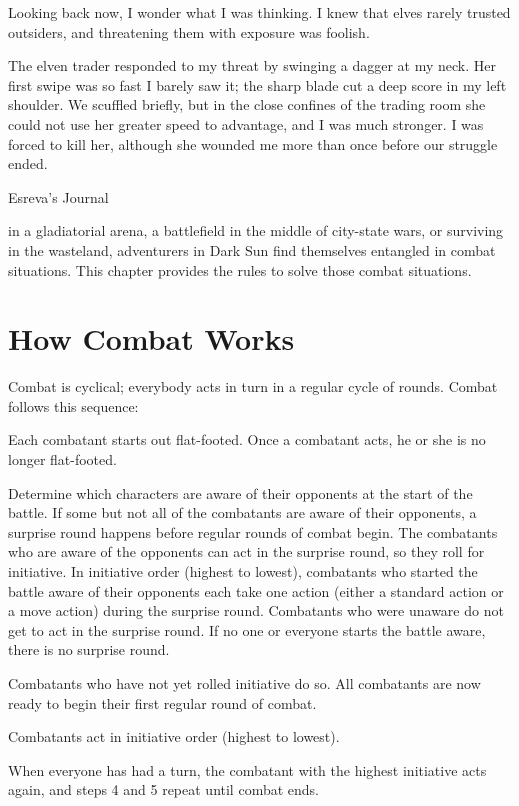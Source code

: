 {Looking back now, I wonder what I was thinking. I knew that elves rarely trusted outsiders, and threatening them with exposure was foolish.

The elven trader responded to my threat by swinging a dagger at my neck. Her first swipe was so fast I barely saw it; the sharp blade cut a deep score in my left shoulder. We scuffled briefly, but in the close confines of the trading room she could not use her greater speed to advantage, and I was much stronger. I was forced to kill her, although she wounded me more than once before our struggle ended.}{Esreva's Journal}

 in a gladiatorial arena, a battlefield in the middle of city-state wars, or surviving in the wasteland, adventurers in {\tableheader Dark Sun} find themselves entangled in combat situations. This chapter provides the rules to solve those combat situations.

\section{How Combat Works}
Combat is cyclical; everybody acts in turn in a regular cycle of rounds. Combat follows this sequence:

\begin{enumerate*}
\item Each combatant starts out flat-footed. Once a combatant acts, he or she is no longer flat-footed.

\item Determine which characters are aware of their opponents at the start of the battle. If some but not all of the combatants are aware of their opponents, a surprise round happens before regular rounds of combat begin. The combatants who are aware of the opponents can act in the surprise round, so they roll for initiative. In initiative order (highest to lowest), combatants who started the battle aware of their opponents each take one action (either a standard action or a move action) during the surprise round. Combatants who were unaware do not get to act in the surprise round. If no one or everyone starts the battle aware, there is no surprise round.

\item Combatants who have not yet rolled initiative do so. All combatants are now ready to begin their first regular round of combat.

\item Combatants act in initiative order (highest to lowest).

\item When everyone has had a turn, the combatant with the highest initiative acts again, and steps 4 and 5 repeat until combat ends.
\end{enumerate*}

